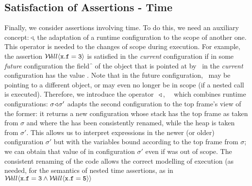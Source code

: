 \subsection{Satisfaction of Assertions - Time}
 Finally, we  consider assertions involving time. To do this, we need  an  auxiliary concept:
$\!\triangleleft\!$, the adaptation of a runtime configuration to the scope  
of another one. This operator is needed to   the changes of scope during execution. For example, the assertion
${{\mathcal W}\!ill}\langle{\mbox{\tt{x}}}.{\mbox{\tt{f}}}={\mbox{\tt{3}}}\rangle$  is satisfied in the \emph{current} configuration %
 if in some {\em future} configuration the field  \f\, of the object that is pointed at 
 by \x\, in the {\em current} configuration has the value .
 Note that in the future  configuration, \x\, may be pointing to a different object, or may
even no longer be in scope (\eg if a nested call  is executed).
Therefore, we introduce the operator \  $\!\triangleleft\!\;$,  \ \ which combines runtime configurations: $\sigma \!\triangleleft\! \sigma'$ adapts the second configuration to the top frame's view of the former: it returns a new configuration whose stack has  the top frame as taken from $\sigma$ and where the  has been consistently renamed, while the heap is taken from $\sigma'$. This allows us to interpret expressions  in the newer (or older) configuration $\sigma'$ but with the variables bound according to the top frame from $\sigma$; \eg we can obtain that value of  in configuration  $\sigma'$ even if  was out of scope. The consistent renaming of the code allows the correct modelling of execution (as needed,   for the semantics of  nested time assertions, as \eg in ${{\mathcal W}\!ill}\langle{\mbox{\tt{x}}}.{\mbox{\tt{f}}}={\mbox{\tt{3}}} \wedge {{\mathcal W}\!ill}\langle{\mbox{\tt{x}}}.{\mbox{\tt{f}}}={\mbox{\tt{5}}}\rangle\rangle$



